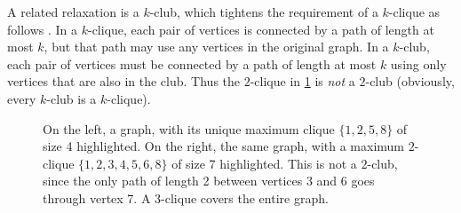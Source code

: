 \documentclass[letterpaper]{article}
\begin{document}
A related relaxation is a $k$-club, which tightens the requirement of a $k$-clique as follows
\cite{Mokken:1979}. In a $k$-clique, each pair of vertices is connected by a path of length at most
$k$, but that path may use any vertices in the original graph. In a $k$-club, each pair of vertices
must be connected by a path of length at most $k$ using only vertices that are also in the club.
Thus the $2$-clique in \cref{figure:k-cliques} is \emph{not} a $2$-club (obviously, every $k$-club
is a $k$-clique).

\begin{figure}[b!] %
    \centering
    \hspace{3em}

    \caption{On the left, a graph, with its unique maximum clique $\{1, 2, 5, 8\}$ of size 4
        highlighted. On the right, the same graph, with a maximum $2$-clique $\{1, 2, 3, 4, 5, 6, 8\}$
        of size 7 highlighted. This is not a $2$-club, since the only path of length 2 between vertices 3 and 6
        goes through vertex 7. A $3$-clique covers the entire graph.}
    \label{figure:k-cliques}
\end{figure}
\end{document}
